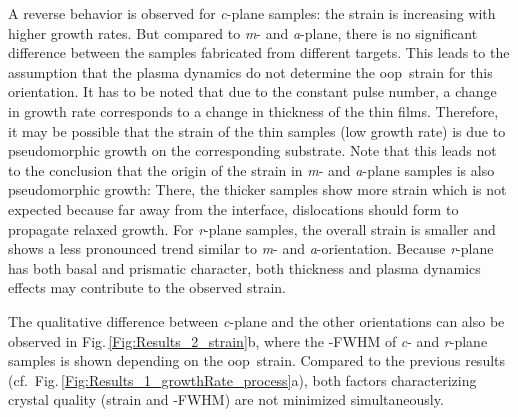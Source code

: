 A reverse behavior is observed for \textit{c}-plane samples: the strain is increasing with higher growth rates.
But compared to \textit{m}- and \textit{a}-plane, there is no significant difference between the samples fabricated from different targets.
This leads to the assumption that the plasma dynamics do not determine the \gls{oop}\ strain for this orientation.
It has to be noted that due to the constant pulse number, a change in growth rate corresponds to a change in thickness of the thin films.
Therefore, it may be possible that the strain of the thin samples (low growth rate) is due to pseudomorphic growth on the corresponding  substrate.
Note that this leads not to the conclusion that the origin of the strain in \textit{m}- and \textit{a}-plane samples is also pseudomorphic growth:
There, the thicker samples show more strain which is not expected because far away from the interface, dislocations should form to propagate relaxed growth.
For \textit{r}-plane samples, the overall strain is smaller and shows a less pronounced trend similar to \textit{m}- and \textit{a}-orientation.
Because \textit{r}-plane has both basal and prismatic character, both thickness and plasma dynamics effects may contribute to the observed strain.

The qualitative difference between \textit{c}-plane and the other orientations can also be observed in Fig.\,\ref{Fig:Results_2_strain}b, where the \textomega-FWHM of \textit{c}- and \textit{r}-plane samples is shown depending on the \gls{oop}\ strain.
Compared to the previous results (cf.\ Fig.\,\ref{Fig:Results_1_growthRate_process}a), both factors characterizing crystal quality (strain and \textomega-FWHM) are not minimized simultaneously.